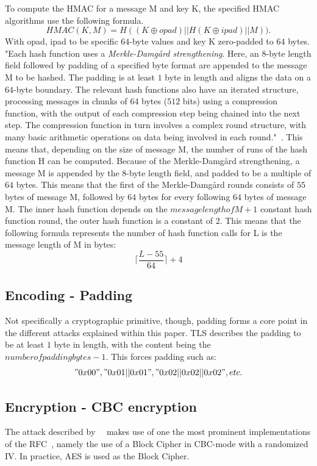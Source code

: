 \documentclass[10pt,conference,a4paper]{IEEEtran}
\begin{document}
To compute the HMAC for a message M and key K, the specified HMAC algorithms use the following formula. 
\[ HMAC(K,M) = H((K \oplus opad)||H(K \oplus ipad)||M)). \]
With opad, ipad to be specific $64$-byte values and key K zero-padded to $64$ bytes. "Each hash function uses a \textit{Merkle-Damg\aa rd strengthening}. Here, an 8-byte length field followed by padding of a specified byte format are appended to the message M to be hashed. The padding is at least $1$ byte in length and aligns the data on a $64$-byte boundary. The relevant hash functions also have an iterated structure, processing messages in chunks of $64$ bytes ($512$ bits) using a compression function, with the output of each compression step being chained into the next step. The compression function in turn involves a complex round structure, with many basic arithmetic operations on data being involved in each round."~\cite{alfardan2013lucky}. This means that, depending on the size of message M, the number of runs of the hash function H can be computed. Because of the Merkle-Damg\aa rd strengthening, a message M is appended by the $8$-byte length field, and padded to be a multiple of $64$ bytes. This means that the first of the Merkle-Damg\aa rd rounds consists of $55$ bytes of message M, followed by $64$ bytes for every following $64$ bytes of message M. The inner hash function depends on the $message length of M + 1$ constant hash function round, the outer hash function is a constant of $2$. This means that the following formula represents the number of hash function calls for L is the message length of M in bytes:
\[ \lceil \frac{L - 55}{64} \rceil + 4 \]

\subsection{Encoding - Padding}
\label{sec:crypto:padding}
Not specifically a cryptographic primitive, though, padding forms a core point in the different attacks explained within this paper. TLS describes the padding to be at least $1$ byte in length, with the content being the $number of padding bytes - 1$. This forces padding such as:
\["0x00", "0x01||0x01", "0x02||0x02||0x02", etc. \]

\subsection{Encryption - CBC encryption}
\label{sec:crypto:encryption}
The attack described by~\citeauthor{alfardan2013lucky}~\cite{alfardan2013lucky} makes use of one the most prominent implementations of the RFC~\cite{ietf2008transport}, namely the use of a Block Cipher in CBC-mode with a randomized IV. In practice, AES is used as the Block Cipher.
\end{document}
